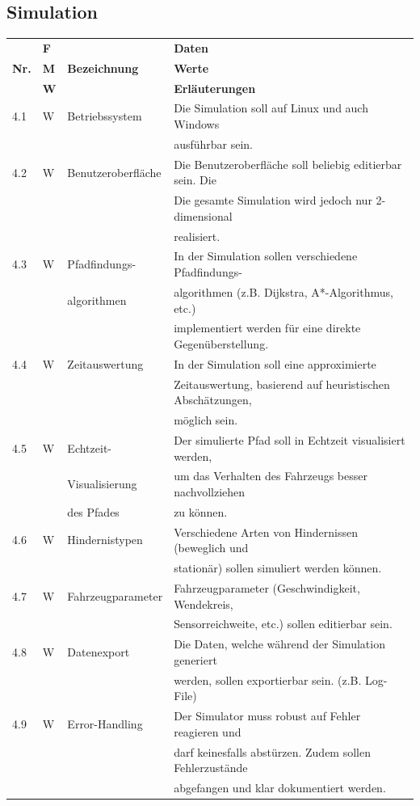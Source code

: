 \documentclass[../main.tex]{subfiles}
\begin{document}
\subsection{Simulation}
\begin{tabular}{|l|l|l|l|}
  \hline
  & \textbf{F} & & \textbf{Daten} \\
  \textbf{Nr.} & \textbf{M} & \textbf{Bezeichnung} & \textbf{Werte} \\
  & \textbf{W} & & \textbf{Erläuterungen} \\
  \hline
  4.1 & W & Betriebssystem & Die Simulation soll auf Linux und auch Windows \\
  & & & ausführbar sein. \\
  \hline
  4.2 & W & Benutzeroberfläche & Die Benutzeroberfläche soll beliebig
  editierbar sein. Die \\
  & & & Die gesamte Simulation wird jedoch nur 2-dimensional \\
  & & & realisiert. \\
  \hline
  4.3 & W & Pfadfindungs- & In der Simulation sollen verschiedene
  Pfadfindungs- \\
  & & algorithmen & algorithmen (z.B. Dijkstra, A*-Algorithmus, etc.) \\
  & & & implementiert werden für eine direkte Gegenüberstellung. \\
  \hline
  4.4 & W & Zeitauswertung & In der Simulation soll eine approximierte \\
  & & & Zeitauswertung, basierend auf heuristischen Abschätzungen, \\
  & & & möglich sein. \\
  \hline
  4.5 & W & Echtzeit- & Der simulierte Pfad soll in Echtzeit
  visualisiert werden, \\
  & & Visualisierung & um das Verhalten des Fahrzeugs besser nachvollziehen \\
  & & des Pfades & zu können. \\
  \hline
  4.6 & W & Hindernistypen & Verschiedene Arten von Hindernissen
  (beweglich und \\
  & & & stationär) sollen simuliert werden können. \\
  \hline
  4.7 & W & Fahrzeugparameter & Fahrzeugparameter (Geschwindigkeit,
    Wendekreis, \\
  & & & Sensorreichweite, etc.) sollen editierbar sein. \\
  \hline
  4.8 & W & Datenexport & Die Daten, welche während der Simulation generiert \\
  & & & werden, sollen exportierbar sein. (z.B. Log-File) \\
  \hline
  4.9 & W & Error-Handling & Der Simulator muss robust auf Fehler
  reagieren und \\
  & & & darf keinesfalls abstürzen. Zudem sollen Fehlerzustände \\
  & & & abgefangen und klar dokumentiert werden. \\
  \hline
\end{tabular}
\end{document}
